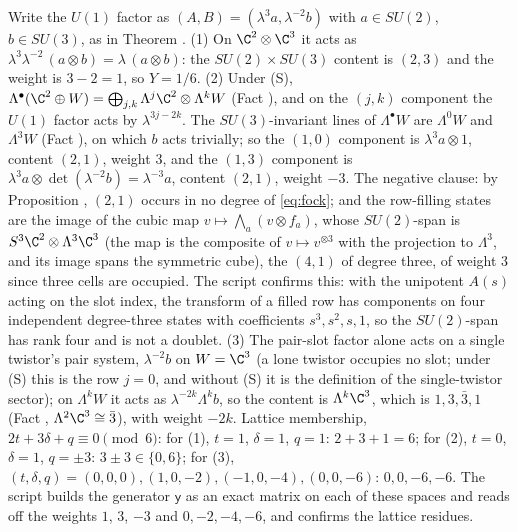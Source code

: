 Write the $U(1)$ factor as $(A, B) = (\lambda^{3}a, \lambda^{-2}b)$ with $a \in SU(2)$, $b \in SU(3)$, as in Theorem . (1) On $\C^{2} \otimes \C^{3}$ it acts as $\lambda^{3}\lambda^{-2}\,(a \otimes b) = \lambda\,(a \otimes b)$: the $SU(2) \times SU(3)$ content is $(2,3)$ and the weight is $3 - 2 = 1$, so $Y = 1/6$. (2) Under (S), $\Lambda^{\bullet}(\C^{2} \oplus W) = \bigoplus_{j,k}\Lambda^{j}\C^{2} \otimes \Lambda^{k}W$ (Fact ), and on the $(j, k)$ component the $U(1)$ factor acts by $\lambda^{3j - 2k}$. The $SU(3)$-invariant lines of $\Lambda^{\bullet}W$ are $\Lambda^{0}W$ and $\Lambda^{3}W$ (Fact ), on which $b$ acts trivially; so the $(1, 0)$ component is $\lambda^{3}a \otimes 1$, content $(2,1)$, weight $3$, and the $(1, 3)$ component is $\lambda^{3}a \otimes \det(\lambda^{-2}b) = \lambda^{-3}a$, content $(2,1)$, weight $-3$. The negative clause: by Proposition , $(2,1)$ occurs in no degree of \eqref{eq:fock}; and the row-filling states are the image of the cubic map $v \mapsto \bigwedge_{a}(v \otimes f_{a})$, whose $SU(2)$-span is $S^{3}\C^{2} \otimes \Lambda^{3}\C^{3}$ (the map is the composite of $v \mapsto v^{\otimes 3}$ with the projection to $\Lambda^{3}$, and its image spans the symmetric cube), the $(4,1)$ of degree three, of weight $3$ since three cells are occupied. The script confirms this: with the unipotent $A(s)$ acting on the slot index, the transform of a filled row has components on four independent degree-three states with coefficients $s^{3}, s^{2}, s, 1$, so the $SU(2)$-span has rank four and is not a doublet. (3) The pair-slot factor alone acts on a single twistor's pair system, $\lambda^{-2}b$ on $W = \C^{3}$ (a lone twistor occupies no slot; under (S) this is the row $j = 0$, and without (S) it is the definition of the single-twistor sector); on $\Lambda^{k}W$ it acts as $\lambda^{-2k}\Lambda^{k}b$, so the content is $\Lambda^{k}\C^{3}$, which is $1, 3, \bar{3}, 1$ (Fact , $\Lambda^{2}\C^{3} \cong \bar{3}$), with weight $-2k$. Lattice membership, $2t + 3\delta + q \equiv 0 \pmod 6$: for (1), $t = 1$, $\delta = 1$, $q = 1$: $2 + 3 + 1 = 6$; for (2), $t = 0$, $\delta = 1$, $q = \pm 3$: $3 \pm 3 \in \{0, 6\}$; for (3), $(t, \delta, q) = (0, 0, 0), (1, 0, -2), (-1, 0, -4), (0, 0, -6)$: $0, 0, -6, -6$. The script builds the generator $\mathsf{y}$ as an exact matrix on each of these spaces and reads off the weights $1$, $3$, $-3$ and $0, -2, -4, -6$, and confirms the lattice residues.
